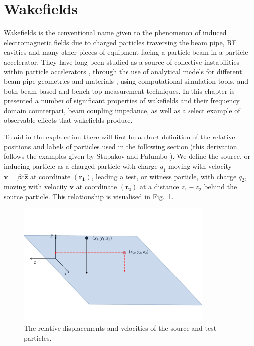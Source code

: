 \section{Wakefields}

Wakefields is the conventional name given to the phenomenon of induced electromagnetic fields due to charged particles traversing the beam pipe, RF cavities and many other pieces of equipment facing a particle beam in a particle accelerator. They have long been studied as a source of collective instabilities within particle accelerators \cite{Laslett:ResWallInstab}, through the use of analytical models for different beam pipe geometries \cite{Stupakov:wakeandImp, Stupakov:surfaceRough, Stupakov:adInImpTheory} and materials \cite{Mounet:PhDThesis}, using computational simulation tools, and both beam-based and bench-top measurement techniques. In this chapter is presented a number of significant properties of wakefields and their frequency domain counterpart, beam coupling impedance, as well as a select example of observable effects that wakefields produce.

To aid in the explanation there will first be a short definition of the relative positions and labels of particles used in the following section (this derivation follows the examples given by Stupakov \cite{Stupakov:wakeandImp} and Palumbo \cite{Palumbo:Wakes}). We define the source, or inducing particle as a charged particle with charge $q_{1}$ moving with velocity $\mathbf{v} = \beta{}c \mathbf{\hat{z}}$ at coordinate $\left( \mathbf{r_{1}} \right)$, leading a test, or witness particle, with charge $q_{2}$, moving with velocity $\mathbf{v}$ at coordinate $\left( \mathbf{r_{2}} \right)$ at a distance $z_{1} - z_{2}$ behind the source particle. This relationship is visualised in Fig.~\ref{fig:source_and_wit}.

\begin{figure}
\begin{center}
\includegraphics[width=0.85\textwidth]{Wakefields_and_Impedances/figures/source-witness-pos.pdf}
\end{center}
\caption{The relative displacements and velocities of the source and test particles.}
\label{fig:source_and_wit}
\end{figure} 


